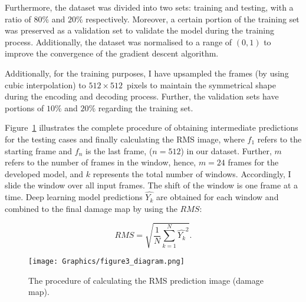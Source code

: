 \documentclass{IOS-Book-Article}
\begin{document}
Furthermore, the dataset was divided into two sets: training and testing, with a ratio of \(80\%\) and \(20\% \) respectively.
Moreover, a certain portion of the training set was preserved as a validation set to validate the model during the training process.
Additionally, the dataset was normalised to a range of \((0, 1)\) to improve the convergence of the gradient descent algorithm.

Additionally, for the training purposes, I have upsampled the frames (by using cubic interpolation) to \(512\times512\)~pixels to maintain the symmetrical shape during the encoding and decoding process.
Further, the validation sets have portions of \(10\%\) and \(20\%\) regarding the training set.

Figure~\ref{fig:Diagram_exp_predictions} illustrates the complete procedure of obtaining intermediate predictions for the testing cases and finally calculating the RMS image, where \(f_{1}\) refers to the starting frame and \(f_{n}\) is the last frame, (\(n=512\)) in our dataset.
Further, \(m\) refers to the number of frames in the window, hence, \(m=24\) frames for the developed model, and \(k\) represents the total number of windows.
Accordingly, I slide the window over all input frames.
The shift of the window is one frame at a time.
Deep learning model predictions \(\hat{Y_k}\) are obtained for each window and combined to the final damage map by using the $RMS$:

\begin{equation}
	RMS = \sqrt{\frac{1}{N}\sum_{k=1}^{N}\hat{Y_k}^2}.	
	\label{RMS}
\end{equation}
\begin{figure}[!h]
	\centering
	\texttt{[image: Graphics/figure3\_diagram.png]}
	\caption{The procedure of calculating the RMS prediction image (damage map).}
	\label{fig:Diagram_exp_predictions}
\end{figure}

\end{document}
